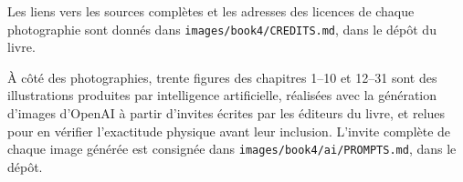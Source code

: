 Les liens vers les sources complètes et les adresses des licences de
chaque photographie sont donnés dans
\texttt{images/book4/CREDITS.md}, dans le dépôt du livre.

\bigskip
À côté des photographies, trente figures des chapitres 1--10 et
12--31 sont des illustrations produites par intelligence
artificielle, réalisées avec la génération d'images d'OpenAI à partir
d'invites écrites par les éditeurs du livre, et relues pour en
vérifier l'exactitude physique avant leur inclusion. L'invite
complète de chaque image générée est consignée dans
\texttt{images/book4/ai/PROMPTS.md}, dans le dépôt.
\clearpage
